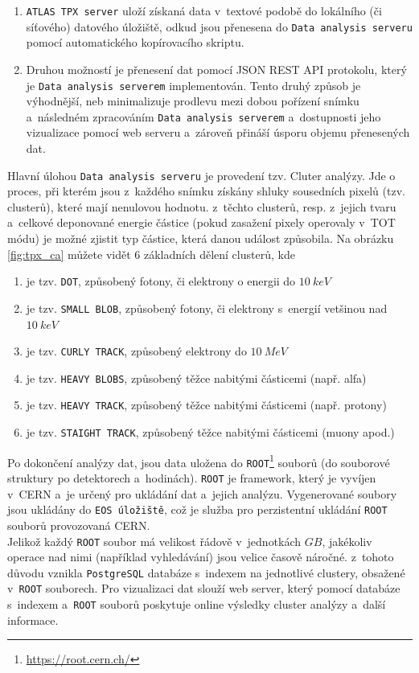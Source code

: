 \begin{description}
		\begin{enumerate}
			\item \texttt{ATLAS TPX server} uloží získaná data v~textové podobě do lokálního (či síťového) datového úložiště, odkud jsou přenesena do \texttt{Data analysis serveru} pomocí automatického kopírovacího skriptu.
			\item Druhou možností je přenesení dat pomocí JSON REST API protokolu, který je \texttt{Data analysis serverem} implementován. Tento druhý způsob je výhodnější, neb minimalizuje prodlevu mezi dobou pořízení snímku a~následném zpracováním \texttt{Data analysis serverem} a~dostupnosti jeho vizualizace pomocí web serveru a~zároveň přináší úsporu objemu přenesených dat.
		\end{enumerate}
		Hlavní úlohou \texttt{Data analysis serveru} je provedení tzv. Cluter analýzy. Jde o proces, při kterém jsou z~každého snímku získány shluky sousedních pixelů (tzv. clusterů), které mají nenulovou hodnotu. z~těchto clusterů, resp. z~jejich tvaru a~celkové deponované energie částice (pokud zasažení pixely operovaly v~TOT módu) je možné zjistit typ částice, která danou událost způsobila. Na obrázku \ref{fig:tpx_ca} můžete vidět 6 základních dělení clusterů, kde
		 \begin{enumerate}[label=(\alph*)]
			\item je tzv. \texttt{DOT}, způsobený fotony, či elektrony o energii do $10~keV$
			\item je tzv. \texttt{SMALL BLOB}, způsobený fotony, či elektrony s~energií vetšinou nad $10~keV$
			\item je tzv. \texttt{CURLY TRACK}, způsobený elektrony do $10~MeV$
			\item je tzv. \texttt{HEAVY BLOBS}, způsobený těžce nabitými částicemi (např. alfa)
			\item je tzv. \texttt{HEAVY TRACK}, způsobený těžce nabitými částicemi (např. protony)
			\item je tzv. \texttt{STAIGHT TRACK}, způsobený těžce nabitými částicemi (muony apod.)
		\end{enumerate}
		Po dokončení analýzy dat, jsou data uložena do \texttt{ROOT}\footnote{\url{https://root.cern.ch/}} souborů (do souborové struktury po detektorech a~hodinách). \texttt{ROOT} je framework, který je vyvíjen v~CERN a~je určený pro ukládání dat a~jejich analýzu. Vygenerované soubory jsou ukládány do \texttt{EOS úložiště}, což je služba pro perzistentní ukládání \texttt{ROOT} souborů provozovaná CERN.\\
		Jelikož každý \texttt{ROOT} soubor má velikost řádově v~jednotkách $GB$, jakékoliv operace nad nimi (například vyhledávání) jsou velice časově náročné. z~tohoto důvodu vznikla \texttt{PostgreSQL} databáze s~indexem na jednotlivé clustery, obsažené v~\texttt{ROOT} souborech. 
		Pro vizualizaci dat slouží web server, který pomocí databáze s~indexem a~\texttt{ROOT} souborů poskytuje online výsledky cluster analýzy a~další informace.
\end{description}

